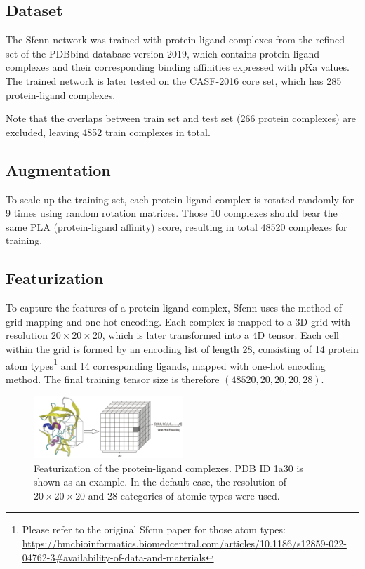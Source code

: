 \documentclass[unnumsec,webpdf,contemporary,large]{oup-authoring-template}
\theoremstyle{thmstyleone}%
\theoremstyle{thmstyletwo}%
\theoremstyle{thmstylethree}%
\begin{document}
\subsection{Dataset}
The Sfcnn network was trained with protein-ligand complexes from the refined set of the PDBbind database version 2019, 
which contains protein-ligand complexes and their corresponding binding affinities expressed with pKa values. 
The trained network is later tested on the CASF-2016 core set, which has 285 protein-ligand complexes.

Note that the overlaps between train set and test set (266 protein complexes) are excluded, 
leaving 4852 train complexes in total.

\subsection{Augmentation}
To scale up the training set, each protein-ligand complex is rotated randomly for 9 times 
using random rotation matrices. Those 10 complexes should bear the same PLA 
(protein-ligand affinity) score, resulting in total 48520 complexes for training.

\subsection{Featurization}
To capture the features of a protein-ligand complex, Sfcnn uses the method of grid 
mapping and one-hot encoding. Each complex is mapped to a 3D grid with 
resolution $20 \times 20 \times 20$, which is later transformed into a 4D tensor. 
Each cell within the grid is formed by an encoding list of length 28, 
consisting of 14 protein atom types\footnote{Please refer to the original Sfcnn paper 
for those atom types: \url{https://bmcbioinformatics.biomedcentral.com/articles/10.1186/s12859-022-04762-3\#availability-of-data-and-materials}} and 14 corresponding ligands, mapped with one-hot encoding method. The final training tensor size is therefore $(48520, 20, 20, 20, 28)$.

\begin{figure}[!t]
    \centering
    \includegraphics[width=0.5\textwidth]{images/one_hot.png}
    \caption{Featurization of the protein-ligand complexes. PDB ID 1a30 is shown as an example. In the default case, the resolution of $20\times20\times20$ and 28 categories of atomic types were used.}
    \label{fig:onehot}
\end{figure}
\end{document}
